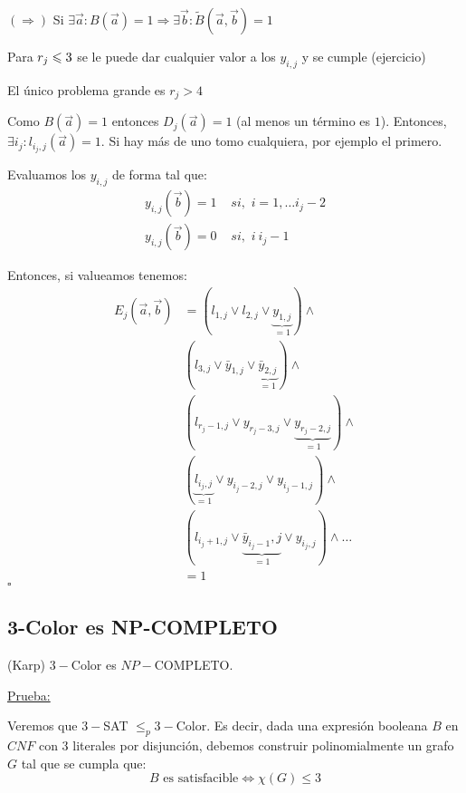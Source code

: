 \documentclass[12pt,a4paper]{article}
\begin{document}
$(\Rightarrow)$ Si $\exists \overrightarrow{a} : B(\overrightarrow{a}) = 1 \Rightarrow \exists \overrightarrow{b} : \widetilde{B}(\overrightarrow{a},\overrightarrow{b}) = 1$
\medskip

Para $r_{j} \leqslant 3$ se le puede dar cualquier valor a los $y_{i,j}$ y se cumple (ejercicio)
\medskip

El único problema grande es $r_{j} > 4$
\medskip

Como $B(\overrightarrow{a}) = 1$ entonces $D_{j}(\overrightarrow{a}) = 1$ (al menos 
un término es $1$). Entonces, $\exists i_{j} : l_{i_{j},j}(\overrightarrow{a}) = 1$.
Si hay más de uno tomo cualquiera, por ejemplo el primero.
\medskip

Evaluamos los $y_{i,j}$ de forma tal que:
\begin{align*}
    y_{i,j}(\overrightarrow{b}) = 1 &\,\, si,\,\, i = 1,\ldots i_{j}-2 \\
    y_{i,j}(\overrightarrow{b}) = 0 &\,\, si,\,\, i \> i_{j}-1
\end{align*}

Entonces, si valueamos tenemos:
\begin{align*}
    E_{j}(\overrightarrow{a},\overrightarrow{b}) &= (l_{1,j} \vee l_{2,j} \vee \underbrace{y_{1,j}}_{=1}) \wedge \\
    & (l_{3,j} \vee \bar{y}_{1,j} \vee \underbrace{\bar{y}_{2,j}}_{=1}) \wedge \\
    & (l_{r_{j}-1,j} \vee y_{r_{j}-3,j} \vee \underbrace{y_{r_{j}-2,j}}_{=1}) \wedge \\
    & (\underbrace{l_{i_{j},j}}_{=1} \vee y_{i_{j}-2,j} \vee y_{i_{j}-1,j}) \wedge \\
    & (l_{i_{j}+1,j} \vee \underbrace{\bar{y}_{i_{j}-1},j}_{=1} \vee y_{i_{j},j}) \wedge \ldots \\
    &= 1
\end{align*}
$\square$

\subsection{3-Color es NP-COMPLETO}
\begin{teorema} (Karp) $3-$Color es $NP-$COMPLETO.
\end{teorema}

\underline{Prueba:}
\medskip

Veremos que $3-$SAT $\leq_{p} 3-$Color. Es decir, dada una expresión booleana $B$ 
en $CNF$ con $3$ literales por disjunción, debemos construir polinomialmente un grafo 
$G$ tal que se cumpla que:
$$B \text{ es satisfacible} \Leftrightarrow \chi (G) \leq 3$$ 
\end{document}
